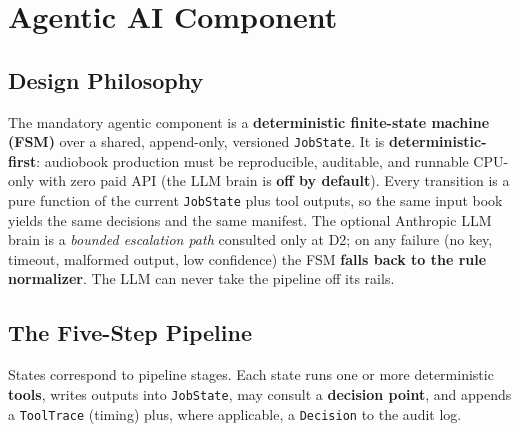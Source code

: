 \documentclass[12pt,a4paper]{article}
\begin{document}
\section{Agentic AI Component}
\label{sec:agent}

\subsection{Design Philosophy}

The mandatory agentic component is a \textbf{deterministic finite-state machine (FSM)} over a shared, append-only, versioned \texttt{JobState}. It is \textbf{deterministic-first}: audiobook production must be reproducible, auditable, and runnable CPU-only with zero paid API (the LLM brain is \textbf{off by default}). Every transition is a pure function of the current \texttt{JobState} plus tool outputs, so the same input book yields the same decisions and the same manifest. The optional Anthropic LLM brain is a \emph{bounded escalation path} consulted only at D2; on any failure (no key, timeout, malformed output, low confidence) the FSM \textbf{falls back to the rule normalizer}. The LLM can never take the pipeline off its rails.

\subsection{The Five-Step Pipeline}

States correspond to pipeline stages. Each state runs one or more deterministic \textbf{tools}, writes outputs into \texttt{JobState}, may consult a \textbf{decision point}, and appends a \texttt{ToolTrace} (timing) plus, where applicable, a \texttt{Decision} to the audit log.
\end{document}

